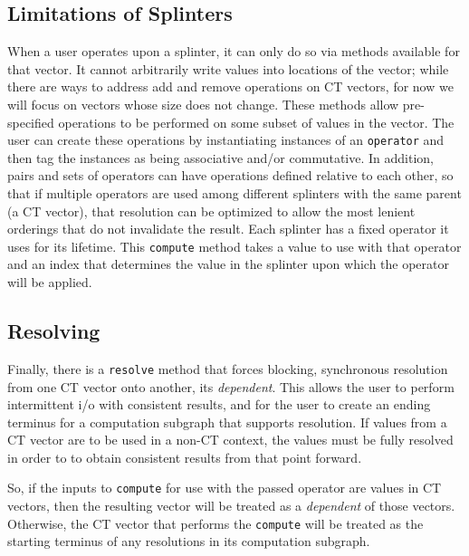\subsection{Limitations of Splinters}
When a user operates upon a splinter, it can only do so via methods
available for that vector. It cannot arbitrarily write values into locations of
the vector; while there are ways to address add and remove operations on CT
vectors, for now we will focus on vectors whose size does not change.
These methods allow pre-specified operations to be performed on some subset of
values in the vector. The user can create these operations by instantiating
instances of an \texttt{operator} and then tag the instances as being associative and/or
commutative. In addition, pairs and sets of operators can have operations
defined relative to each other, so that if multiple operators are used among
different splinters with the same parent (a CT vector), that resolution can
be optimized to allow the most lenient orderings that do not invalidate the
result. Each splinter has a fixed operator it uses for its lifetime. 
This \texttt{compute} method takes a value to use with that operator and an index that 
determines the value in the splinter upon which the operator will be applied.

\subsection{Resolving}
Finally, there is a \texttt{resolve} method that forces blocking, synchronous
resolution from one CT vector onto another, its \textit{dependent}. 
This allows the user to perform intermittent i/o
with consistent results, and for the user to create an ending terminus for a
computation subgraph that supports resolution. If values from a CT vector are
to be used in a non-CT context, the values must be fully resolved in order to
to obtain consistent results from that point forward.

So, if the inputs to \texttt{compute} for use with the passed operator are values in 
CT vectors, then the resulting vector will be treated as a \textit{dependent} of those 
vectors. Otherwise, the CT vector that performs
the \texttt{compute} will be treated as the starting terminus of any resolutions in its 
computation subgraph.

